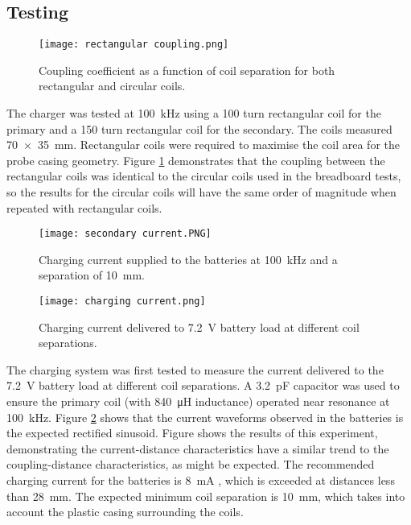 \subsection{Testing}
\begin{figure}[htbp]
	\centering
	\texttt{[image: rectangular coupling.png]}
	\caption{Coupling coefficient as a function of coil separation for both rectangular and circular coils.}
	\label{fig: rectangular coupling}
\end{figure}


The charger was tested at \SI{100}{\kilo\hertz} using a 100 turn rectangular coil for the primary and a 150 turn rectangular coil for the secondary. The coils measured \SI{70 x 35}{\milli\metre}. Rectangular coils were required to maximise the coil area for the probe casing geometry. Figure \ref{fig: rectangular coupling} demonstrates that the coupling between the rectangular coils was identical to the circular coils used in the breadboard tests, so the results for the circular coils will have the same order of magnitude when repeated with rectangular coils.\\


\begin{figure}[htbp]
	\centering
	\texttt{[image: secondary current.PNG]}
	\caption{Charging current supplied to the batteries at \SI{100}{\kilo\hertz} and a separation of \SI{10}{\milli\metre}.}
	\label{fig: secondary current}
\end{figure}



\begin{figure}[htbp]
	\centering
	\texttt{[image: charging current.png]}
	\caption{Charging current delivered to \SI{7.2}{\volt} battery load at different coil separations.}
	\label{fig: current distance}
\end{figure}

The charging system was first tested to measure the current delivered to the \SI{7.2}{\volt} battery load at different coil separations. A \SI{3.2}{\pico\farad} capacitor was used to ensure the primary coil (with \SI{840}{\micro\henry} inductance) operated near resonance at \SI{100}{\kilo\hertz}. Figure \ref{fig: secondary current} shows that the current waveforms observed in the batteries is the expected rectified sinusoid. Figure \label{fig: current distance} shows the results of this experiment, demonstrating the current-distance characteristics have a similar trend to the coupling-distance characteristics, as might be expected. The recommended charging current for the batteries is \SI{8}{\milli\ampere} \cite{rs_pro_batteries}, which is exceeded at distances less than \SI{28}{\milli\metre}. The expected minimum coil separation is \SI{10}{\milli\metre}, which takes into account the plastic casing surrounding the coils.\\

